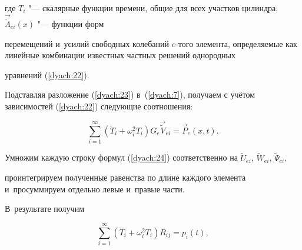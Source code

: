 где  $T_{i}$ "--- скалярные функции времени, общие для всех участков цилиндра; $\vec{\widetilde{\Lambda}}_{ei}(x)$ "--- функции форм

перемещений и~усилий свободных колебаний $e$-того элемента, определяемые как линейные комбинации известных частных решений однородных

уравнений (\ref{dyach:22}).








Подставляя разложение (\ref{dyach:23}) в~(\ref{dyach:7}), получаем с учётом зависимостей (\ref{dyach:22}) следующие соотношения:

\begin{equation}

\label{dyach:24}

\sum\limits_{i=1}^{\infty}(\ddot{T}_{i}+\omega_{i}^{2}T_{i})G_{e}\vec{\widetilde{V}}{}_{ei}=\vec{P}_{e}(x,t).

\end{equation}

Умножим каждую строку формул (\ref{dyach:24}) соответственно на $\widetilde{U}_{ei}$, $\widetilde{W}_{ei}$, $\widetilde{\Psi}_{ei}$, 

проинтегрируем полученные равенства по длине каждого элемента и~просуммируем отдельно левые и~правые части.

В~результате получим

\begin{equation}

\label{dyach:25}

\sum\limits_{i=1}^{\infty}(\ddot{T}_{i}+\omega_{i}^{2}T_{i})R_{ij}=p_{i}(t),

\end{equation}

